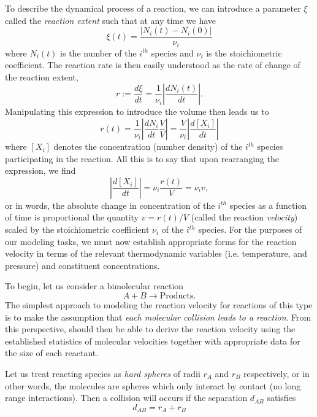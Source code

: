 To describe the dynamical process of a reaction, we can introduce a parameter $\xi$ called the \textit{reaction extent} such that at any time we have
\begin{equation}
  \xi(t) = \frac{\lvert N_i(t) - N_i(0) \rvert}{ \nu_i}
\end{equation}
where $N_i(t)$ is the number  of the $i^{th}$ species and $\nu_i$ is the stoichiometric coefficient. The reaction rate is then easily understood as the rate of change of the reaction extent,
\begin{equation}
  r := \frac{d\xi}{dt} = \frac{1}{\nu_i}\left\lvert \frac{dN_i(t)} { dt} \right\rvert.
\end{equation}
Manipulating this expression to introduce the volume then leads us to
\begin{equation}
  r(t) = \frac{1}{\nu_i}\left\lvert\frac{dN_i}{dt}\frac{V}{V} \right\rvert = \frac{V}{\nu_i}\left\lvert \frac{d[X_i]}{dt} \right\rvert
\end{equation}
where $[X_i]$ denotes the concentration (number density) of the $i^{th}$ species participating in the reaction. All this is to say that upon rearranging the expression, we find
\begin{equation}
  \left\lvert \frac{d[X_i]}{dt} \right\rvert = \nu_i\frac{r(t)}{V} = \nu_iv,
\end{equation}
or in words, the absolute change in concentration of the $i^{th}$ species as a function of time is proportional the quantity $v=r(t)/V$ (called the reaction \textit{velocity}) scaled by the stoichiometric coefficient $\nu_i$ of the $i^{th}$ species. For the purposes of our modeling tasks, we must now establish appropriate forms for the reaction velocity in terms of the relevant thermodynamic variables (i.e. temperature, and pressure) and constituent concentrations.

To begin, let us consider a bimolecular reaction
\begin{equation}
  A + B \longrightarrow \text{Products}.
\end{equation}
The simplest approach to modeling the reaction velocity for reactions of this type is to make the assumption that \textit{each molecular collision leads to a reaction}. From this perspective, should then be able to derive the reaction velocity using the established statistics of molecular velocities together with appropriate data for the size of each reactant.

Let us treat reacting species as \textit{hard spheres} of radii $r_{A}$ and $r_{B}$ respectively, or in other words, the molecules are spheres which only interact by contact (no long range interactions). Then a collision will occurs if the separation $d_{AB}$ satisfies
\begin{equation}
  d_{AB} = r_{A} + r_{B}
\end{equation}

